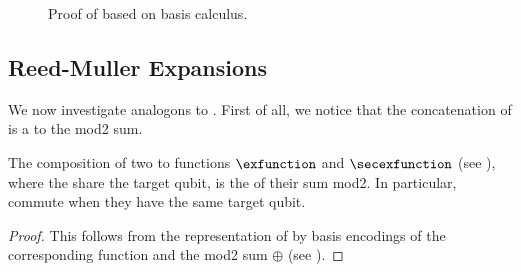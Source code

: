 %        

\begin{figure}
    \begin{center}
        
    \end{center}
    \caption{
        Proof of  based on basis calculus.
    }\label{fig:proofDecomposition}
\end{figure}



\subsection{Reed-Muller Expansions}

We now investigate analogons to \polynomialSparsity{}.
First of all, we notice that the concatenation of \computationCircuits{} is a \computationCircuit{} to the mod2 sum.

\begin{lemma} %
    \label{lem:comCircuitCommutative}
    The composition of two \computationCircuits{} to functions $\exfunction$ and $\secexfunction$ (see ), where the \computationCircuits{} share the target qubit, is the \computationCircuit{} of their sum mod2.
    In particular, \computationCircuits{} commute when they have the same target qubit.
\end{lemma}
\begin{proof}
    This follows from the representation of \computationCircuits{} by basis encodings of the corresponding function and the mod2 sum $\oplus$ (see ).
\end{proof}

